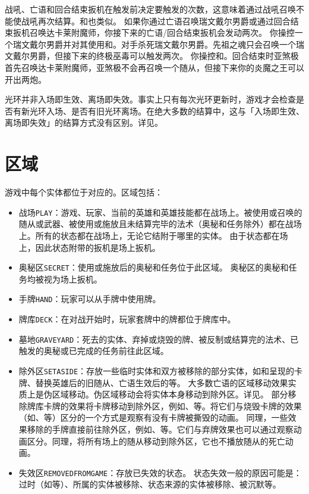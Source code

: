 战吼、亡语和回合结束扳机在触发前决定要触发的次数，这意味着通过战吼召唤不能使战吼再次结算。和也类似。
\notice 如果你通过亡语召唤瑞文戴尔男爵或通过回合结束扳机召唤达卡莱附魔师，你接下来的亡语/回合结束扳机会发动两次。
\example 你操控一个瑞文戴尔男爵并对其使用和。对手杀死瑞文戴尔男爵。先祖之魂只会召唤一个瑞文戴尔男爵，但接下来的终极巫毒可以触发两次。
\example 你操控和。回合结束时亚煞极首先召唤达卡莱附魔师，亚煞极不会再召唤一个随从，但接下来你的炎魔之王可以开出两炮。

光环并非入场即生效、离场即失效。事实上只有每次光环更新时，游戏才会检查是否有新光环入场、是否有旧光环离场。在绝大多数的结算中，这与「入场即生效、离场即失效」的结算方式没有区别。详见。

\section{区域}
\label{zone}

游戏中每个实体都位于对应的。区域包括：

\begin{itemize}[itemsep=\parsep]
    \item 战场\texttt{PLAY}：游戏、玩家、当前的英雄和英雄技能都在战场上。被使用或召唤的随从或武器、被使用或施放且未结算完毕的法术（奥秘和任务除外）都在战场上。所有的状态都在战场上，无论它结附于哪里的实体。
        \notice 由于状态都在场上，因此状态附带的扳机是场上扳机。
    \item 奥秘区\texttt{SECRET}：使用或施放后的奥秘和任务位于此区域。
        \notice 奥秘区的奥秘和任务均被视为场上扳机。
    \item 手牌\texttt{HAND}：玩家可以从手牌中使用牌。
    \item 牌库\texttt{DECK}：在对战开始时，玩家套牌中的牌都位于牌库中。
    \item 墓地\texttt{GRAVEYARD}：死去的实体、弃掉或烧毁的牌、被反制或结算完的法术、已触发的奥秘或已完成的任务前往此区域。
    \item 除外区\texttt{SETASIDE}：存放一些临时实体和双方被移除的部分实体，如和呈现的卡牌、替换英雄后的旧随从、亡语生效后的等。
        \notice 大多数亡语的区域移动效果实质上是伪区域移动。伪区域移动会将实体本身移动到除外区。详见。
        \notice 部分移除牌库卡牌的效果将卡牌移动到除外区，例如、等。将它们与烧毁卡牌的效果（如、等）区分的一个方式是观察有没有卡牌被撕毁的动画。
        \notice 同理，一些效果移除的手牌直接前往除外区，例如、等。它们与弃牌效果也可以通过观察动画区分。同理，将所有场上的随从移动到除外区，它也不播放随从的死亡动画。
    \item 失效区\texttt{REMOVEDFROMGAME}：存放已失效的状态。
        \notice 状态失效一般的原因可能是：过时（如等）、所属的实体被移除、状态来源的实体被移除、被沉默等。
\end{itemize}

